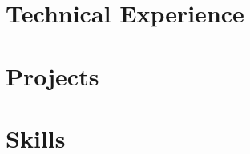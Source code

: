 \documentclass[letter,10pt]{article}
\begin{document}


\section{Technical Experience}


\section{Projects}


\section{Skills}


%
\end{document}
